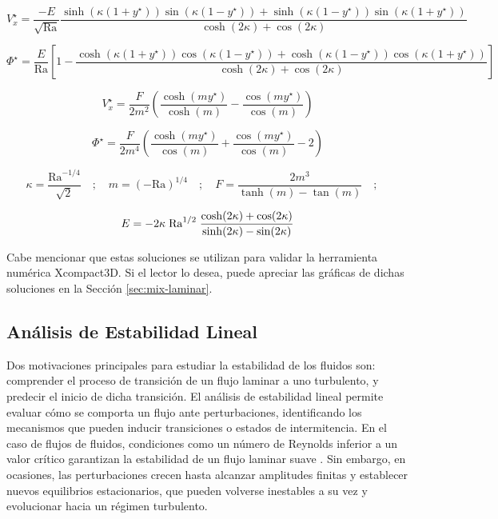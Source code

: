 \small{
\begin{equation}
V^{\star}_x = \frac{-E}{\sqrt{\text{Ra}}} \frac{\sinh(\kappa(1+y^{\star}))\sin(\kappa(1-y^{\star})) + \sinh(\kappa(1-y^{\star}))\sin(\kappa(1+y^{\star})) }{\cosh(2\kappa) + \cos(2\kappa)}
\label{eq:vel_asist_boyant}
\end{equation}

\begin{equation}
\Phi^{\star} = \frac{E}{\text{Ra}} \left[ 1 - \frac{\cosh(\kappa(1+y^{\star}))\cos(\kappa(1-y^{\star})) + \cosh(\kappa(1-y^{\star}))\cos(\kappa(1+y^{\star}))}{\cosh(2\kappa) + \cos(2\kappa)} \right] 
\label{eq:theta_asist_boyant}
\end{equation}

\begin{equation}
V^{\star}_x = \frac{F}{2 m^2} \left( \frac{\cosh(m y^{\star})}{\cosh(m)} - \frac{\cos(m y^{\star})}{\cos(m)} \right) 
\label{eq:vel_opo_boyant}
\end{equation}

\begin{equation}
\Phi^{\star} = \frac{F}{2 m^4} \left( \frac{\cosh(m y^{\star})}{\cos(m)} + \frac{\cos(m y^{\star})}{\cos(m)} - 2 \right) 
\label{eq:theta_opo_boyant}
\end{equation}

\begin{equation*}
\kappa = \frac{\text{Ra}^{-1/4}}{\sqrt{2}} \quad ; \quad m = (-\text{Ra})^{1/4} \quad ; \quad F = \frac{2 m^3}{\tanh(m)-\tan(m)} \quad ; \quad
\end{equation*}

\begin{equation*}
E= -2 \kappa \hspace{1mm} \text{Ra}^{1/2} \hspace{1mm} \frac{\cosh(2\kappa) + \cos(2\kappa)}{\sinh(2\kappa) - \sin(2\kappa)} 
\end{equation*}
}
Cabe mencionar que estas soluciones se utilizan para validar la herramienta numérica Xcompact3D. Si el lector lo desea, puede apreciar las gráficas de dichas soluciones en la Sección \ref{sec:mix-laminar}.  


\subsection{Análisis de Estabilidad Lineal} \label{sec:estabilidad}

Dos motivaciones principales para estudiar la estabilidad de los fluidos son: comprender el proceso de transición de un flujo laminar a uno turbulento, y predecir el inicio de dicha transición. El análisis de estabilidad lineal permite evaluar cómo se comporta un flujo ante perturbaciones, identificando los mecanismos que pueden inducir transiciones o estados de intermitencia. En el caso de flujos de fluidos, condiciones como un número de Reynolds inferior a un valor crítico garantizan la estabilidad de un flujo laminar suave \cite{drazin2004hydrodynamic}. Sin embargo, en ocasiones, las perturbaciones crecen hasta alcanzar amplitudes finitas y establecer nuevos equilibrios estacionarios, que pueden volverse inestables a su vez y evolucionar hacia un régimen turbulento. 

